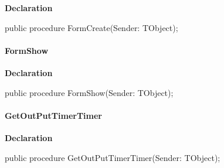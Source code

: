 \documentclass{report}
\newif\ifpdf
\begin{document}
\label{uninstall.TRMForm-FormCreate}
\begin{list}{}{
\setlength{\itemindent}{0cm}
\setlength{\listparindent}{0cm}
\setlength{\leftmargin}{\evensidemargin}
\addtolength{\leftmargin}{\tmplength}
\settowidth{\labelsep}{X}
\addtolength{\leftmargin}{\labelsep}
\setlength{\labelwidth}{\tmplength}
}
\item[\textbf{Declaration}\hfill]
\ifpdf
\begin{flushleft}
\fi
\begin{ttfamily}
public procedure FormCreate(Sender: TObject);\end{ttfamily}

\ifpdf
\end{flushleft}
\fi

\end{list}
\paragraph*{FormShow}\hspace*{\fill}

\label{uninstall.TRMForm-FormShow}
\begin{list}{}{
\setlength{\itemindent}{0cm}
\setlength{\listparindent}{0cm}
\setlength{\leftmargin}{\evensidemargin}
\addtolength{\leftmargin}{\tmplength}
\settowidth{\labelsep}{X}
\addtolength{\leftmargin}{\labelsep}
\setlength{\labelwidth}{\tmplength}
}
\item[\textbf{Declaration}\hfill]
\ifpdf
\begin{flushleft}
\fi
\begin{ttfamily}
public procedure FormShow(Sender: TObject);\end{ttfamily}

\ifpdf
\end{flushleft}
\fi

\end{list}
\paragraph*{GetOutPutTimerTimer}\hspace*{\fill}

\label{uninstall.TRMForm-GetOutPutTimerTimer}
\begin{list}{}{
\setlength{\itemindent}{0cm}
\setlength{\listparindent}{0cm}
\setlength{\leftmargin}{\evensidemargin}
\addtolength{\leftmargin}{\tmplength}
\settowidth{\labelsep}{X}
\addtolength{\leftmargin}{\labelsep}
\setlength{\labelwidth}{\tmplength}
}
\item[\textbf{Declaration}\hfill]
\ifpdf
\begin{flushleft}
\fi
\begin{ttfamily}
public procedure GetOutPutTimerTimer(Sender: TObject);\end{ttfamily}

\ifpdf
\end{flushleft}
\fi

\end{list}
\end{document}
